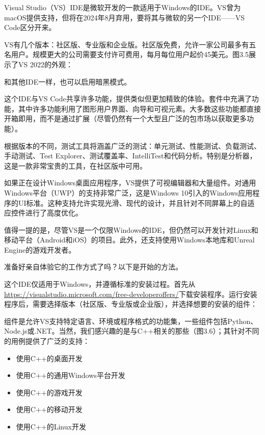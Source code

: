 
Visual Studio（VS）IDE是微软开发的一款适用于Windows的IDE。VS曾为macOS提供支持，但将在2024年8月弃用，要将其与微软的另一个IDE——VS Code区分开来。

VS有几个版本：社区版、专业版和企业版。社区版免费，允许一家公司最多有五名用户。规模更大的公司需要支付许可费用，每月每位用户起价45美元。图3.5展示了VS 2022的外观：


和其他IDE一样，也可以启用暗黑模式。


这个IDE与VS Code共享许多功能，提供类似但更加精致的体验。套件中充满了功能，其中许多功能利用了图形用户界面、向导和可视元素。大多数这些功能都直接开箱即用，而不是通过扩展（尽管仍然有一个大型且广泛的包市场以获取更多功能）。

根据版本的不同，测试工具将涵盖广泛的测试：单元测试、性能测试、负载测试、手动测试、Test Explorer、测试覆盖率、IntelliTest和代码分析。特别是分析器，这是一款非常宝贵的工具，在社区版中可用。

如果正在设计Windows桌面应用程序，VS提供了可视编辑器和大量组件。对通用Windows平台（UWP）的支持非常广泛，这是Windows 10引入的Windows应用程序的UI标准。这种支持允许实现光滑、现代的设计，并且针对不同屏幕上的自适应控件进行了高度优化。

值得一提的是，尽管VS是一个仅限Windows的IDE，但仍然可以开发针对Linux和移动平台（Android和iOS）的项目。此外，还支持使用Windows本地库和Unreal Engine的游戏开发者。

准备好亲自体验它的工作方式了吗？以下是开始的方法。


这个IDE仅适用于Windows，并遵循标准的安装过程。首先从\url{https://visualstudio.microsoft.com/free-developeroffers/}下载安装程序。运行安装程序后，需要选择版本（社区版、专业版或企业版），并选择想要的安装的组件：


组件是允许VS支持特定语言、环境或程序格式的功能集，一些组件包括Python、Node.js或.NET。当然，我们感兴趣的是与C++相关的那些（图3.6）；其针对不同的用例提供了广泛的支持：

\begin{itemize}
\item
使用C++的桌面开发

\item
使用C++的通用Windows平台开发

\item
使用C++的游戏开发

\item
使用C++的移动开发

\item
使用C++的Linux开发
\end{itemize}

